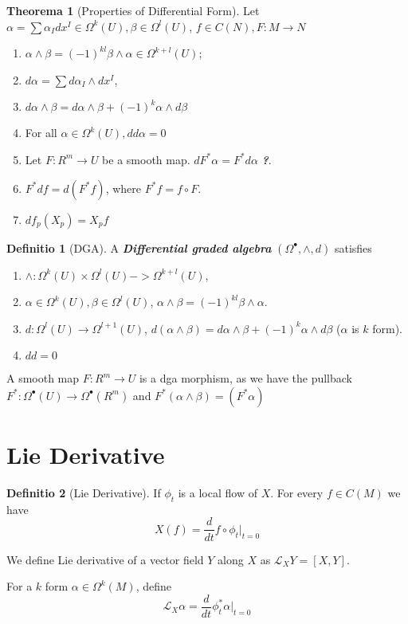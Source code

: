 \documentclass[12pt, a4paper]{article}
\theoremstyle{definition}
\newtheorem{theorem}{Theorema}[section]
\newtheorem{definition}{Definitio}[section]
\theoremstyle{remark}
\renewcommand{\emph}[1]{\textbf{\textit{#1}}}
\begin{document}
\begin{theorem}[Properties of Differential Form]
	Let $\alpha = \sum \alpha_Idx^I \in \Omega^k(U), \beta \in \Omega^l(U)$, $f \in C(N), F: M \rightarrow N$
	\begin{enumerate}
		\item $\alpha \wedge \beta = (-1)^{kl}\beta \wedge \alpha \in \Omega^{k+l}(U)$;
		\item $d \alpha = \sum d \alpha_I \wedge dx^I$,
		\item $d \alpha \wedge \beta = d \alpha \wedge \beta + (-1)^k \alpha \wedge d \beta$
		\item For all $\alpha \in \Omega^k(U), dd \alpha = 0$
		\item Let $F: R^m \rightarrow U$ be a smooth map. $dF^* \alpha = F^* d \alpha$ \emph{?}.
		\item $F^*df = d(F^*f)$, where $F^*f = f \circ F$.
		\item $df_p(X_p) = X_p f$
	\end{enumerate}
\end{theorem}

\begin{definition}[DGA]
	A \emph{Differential graded algebra} $(\Omega^{\bullet}, \wedge, d)$ satisfies 
	\begin{enumerate}
		\item $\wedge: \Omega^k(U) \times \Omega^l(U) -> \Omega^{k+l}(U)$,
		\item $\alpha \in \Omega^k(U), \beta \in \Omega^l(U)$, $\alpha \wedge \beta = (-1)^{kl}\beta \wedge \alpha$.
		\item $d: \Omega^{l}(U) \rightarrow \Omega^{l+1}(U)$, $d(\alpha \wedge \beta) = d \alpha \wedge \beta + (-1)^k \alpha \wedge d \beta$ ($\alpha$ is $k$ form).
		\item $dd = 0$
	\end{enumerate}

	A smooth map $F: R^m \rightarrow U$ is a dga morphism, as we have the pullback $F^*: \Omega^{\bullet}(U) \rightarrow  \Omega^{\bullet}(R^m)$ and $F^*(\alpha \wedge \beta) = (F^* \alpha)$
\end{definition}

\section{Lie Derivative}

\begin{definition}[Lie Derivative]
If $\phi_t$ is a local flow of $X$. For every $f \in C(M)$ we have 
$$
	X(f) = \frac{d}{dt}f \circ \phi_t \bigg\rvert_{t=0}
$$

We define Lie derivative of a vector field $Y$ along $X$ as $\mathscr{L}_XY = [X, Y]$.

For a $k$ form $\alpha \in \Omega^k(M)$, define 
$$
	\mathscr{L}_X \alpha = \frac{d}{dt} \phi_t^* \alpha \bigg\rvert_{t=0}
$$
\end{definition}
\end{document}
